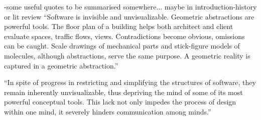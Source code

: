 -some useful quotes to be summarised somewhere... maybe in introduction-history or lit review
``Software is invisible and unvisualizable. Geometric abstractions are powerful tools. The floor plan of a building helps both architect and client evaluate spaces, traffic flows, views. Contradictions become obvious, omissions can be caught. Scale drawings of mechanical parts and stick-figure models of molecules, although abstractions, serve the same purpose. A geometric reality is captured in a geometric abstraction.''~\cite{Brooks1995}

``In spite of progress in restricting and simplifying the structures of software, they remain inherently unvisualizable, thus depriving the mind of some of its most powerful conceptual tools. This lack not only impedes the process of design within one mind, it severely hinders communication among minds.''~\cite{Brooks1995}






